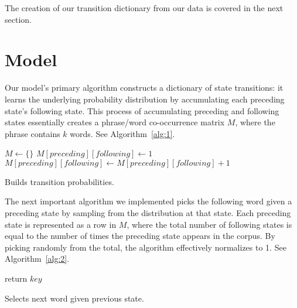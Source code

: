 \documentclass[11pt]{article}
\begin{document}
The creation of our transition dictionary from our data is covered in the next section.

\section{Model}

Our model's primary algorithm constructs a dictionary of state transitions: it  learns the underlying probability distribution by accumulating each preceding state's following state. This process of accumulating preceding and following states essentially creates a phrase/word co-occurrence matrix \(M\), where the phrase contains \(k\) words. See Algorithm~\ref{alg:1}.

\begin{algorithm}
  \begin{algorithmic}
          {$M \gets \{\}$}
        \EndIf
          {$M[preceding][following] \gets 1$}
        \Else
          {$ M[preceding][following] \gets M[preceding][following]+1$}
        \EndIf
      \EndFor
    \EndFor
    \EndProcedure{}
  \end{algorithmic}
  \caption{Builds transition probabilities.}
  \label{alg:1}
\end{algorithm}

The next important algorithm we implemented picks the following word given a preceding state by sampling from the distribution at that state. Each preceding state is represented as a row in \(M\), where the total number of following states is equal to the number of times the preceding state appears in the corpus. By picking randomly from the total, the algorithm effectively normalizes to 1. See Algorithm~\ref{alg:2}.

\begin{algorithm}
  \begin{algorithmic}

        {return $key$}
      \EndIf
    \EndFor
    \EndProcedure{}
  \end{algorithmic}
  \caption{Selects next word given previous state.}
  \label{alg:2}
\end{algorithm}
\end{document}
